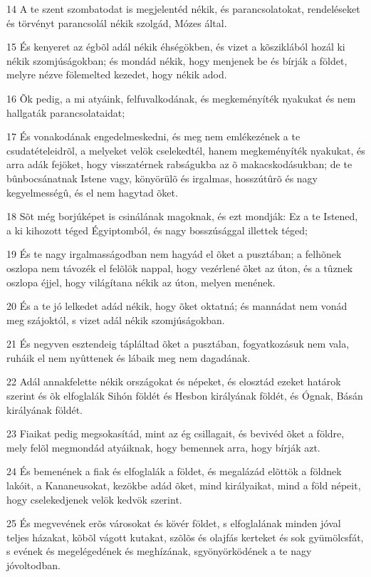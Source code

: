\par 14 A te szent szombatodat is megjelentéd nékik, és parancsolatokat, rendeléseket és törvényt parancsolál nékik szolgád, Mózes által.
\par 15 És kenyeret az égbõl adál nékik éhségökben, és vizet a kõsziklából hozál ki  nékik szomjúságokban; és mondád nékik, hogy menjenek be és bírják a földet, melyre nézve fölemelted kezedet, hogy nékik adod.
\par 16 Õk pedig, a mi atyáink, felfuvalkodának, és megkeményíték nyakukat és nem hallgaták parancsolataidat;
\par 17 És vonakodának engedelmeskedni, és meg nem emlékezének a te csudatételeidrõl, a melyeket velök cselekedtél, hanem megkeményíték nyakukat, és arra adák fejöket, hogy visszatérnek rabságukba az õ makacskodásukban; de te bûnbocsánatnak Istene vagy, könyörülõ és irgalmas, hosszútûrõ és nagy kegyelmességû, és el nem hagytad õket.
\par 18 Sõt még borjúképet is csinálának magoknak, és ezt mondják: Ez a te Istened, a ki kihozott téged Égyiptomból, és nagy bosszúsággal illettek téged;
\par 19 És te nagy irgalmasságodban nem hagyád el õket a pusztában; a felhõnek oszlopa nem távozék el felõlök nappal, hogy vezérlené õket az úton, és a tûznek oszlopa éjjel, hogy világítana nékik az úton, melyen menének.
\par 20 És a te jó lelkedet adád nékik, hogy õket oktatná; és mannádat nem vonád meg szájoktól, s vizet adál nékik szomjúságokban.
\par 21 És negyven esztendeig tápláltad õket a pusztában, fogyatkozásuk nem vala, ruháik el nem nyûttenek és lábaik meg nem dagadának.
\par 22 Adál annakfelette nékik országokat és népeket, és elosztád ezeket határok szerint és õk elfoglalák Sihón földét és Hesbon királyának földét, és Ógnak, Básán királyának földét.
\par 23 Fiaikat pedig megsokasítád, mint az ég csillagait, és bevivéd õket a földre, mely felõl megmondád  atyáiknak, hogy bemennek arra, hogy bírják azt.
\par 24 És bemenének a fiak és elfoglalák a földet, és megalázád elõttök a földnek lakóit, a Kananeusokat, kezökbe adád õket, mind királyaikat, mind a föld népeit, hogy cselekedjenek velök kedvök szerint.
\par 25 És megvevének erõs városokat és kövér földet, s elfoglalának minden jóval teljes házakat, kõbõl vágott kutakat, szõlõs és olajfás kerteket és sok gyümölcsfát, s evének és megelégedének és meghízának, sgyönyörködének a te nagy jóvoltodban.
